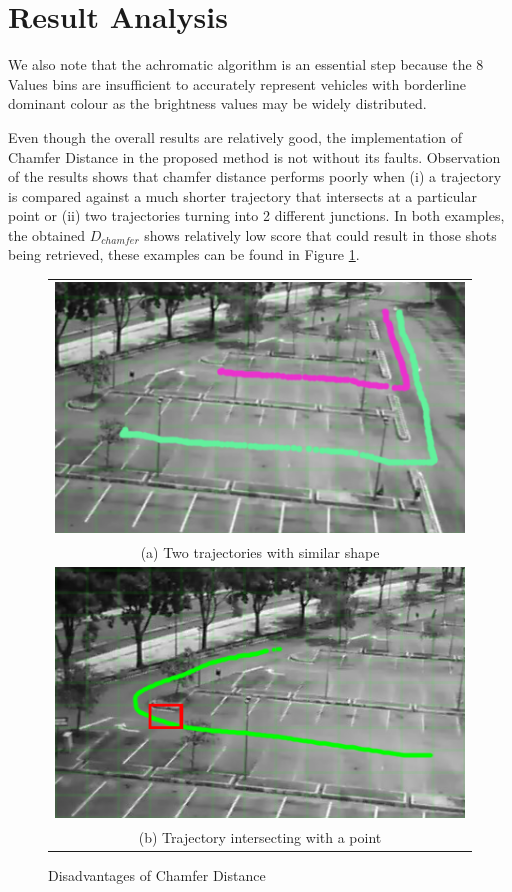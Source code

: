 \section{Result Analysis}
We also note that the achromatic algorithm is an essential step because the 8 Values bins are insufficient to accurately represent vehicles with borderline dominant colour as the brightness values may be widely distributed.

Even though the overall results are relatively good, the implementation of Chamfer Distance in the proposed method is not without its faults. Observation of the results shows that chamfer distance performs poorly when (i) a trajectory is compared against a much shorter trajectory that intersects at a particular point or (ii) two trajectories turning into 2 different junctions. In both examples, the obtained $D_{chamfer}$ shows relatively low score that could result in those shots being retrieved, these examples can be found in Figure  \ref{fig:chamferDisadvantage}.

\begin{figure}[htb!]
  \centering
\begin{tabular}{c}
 \includegraphics[width=0.9\linewidth]{image/retrievalTwo/chamferDisadv2.png}\\
 (a) Two trajectories with similar shape \\
 \includegraphics[width=0.9\linewidth]{image/retrievalTwo/chamferDisadv1.png} \\
 (b) Trajectory intersecting with a point
\end{tabular}
\caption{Disadvantages of Chamfer Distance} \label{fig:chamferDisadvantage}
\end{figure}


 \\


